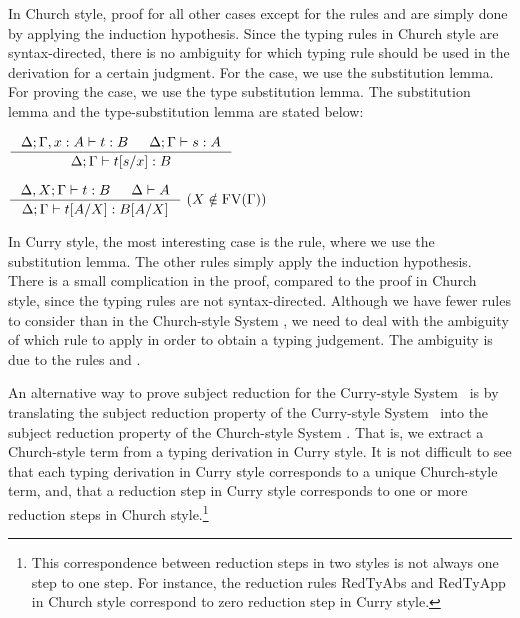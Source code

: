 In Church style, proof for all other cases except for the rules
 and  are simply done by applying
the induction hypothesis. Since the typing rules in Church style are
syntax-directed, there is no ambiguity for which typing rule should be used
in the derivation for a certain judgment. For the  case,
we use the substitution lemma. For proving the  case,
we use the type substitution lemma. The substitution lemma and
the type-substitution lemma are stated below:
\begin{lemma}[substitution]
$ \inference{\Delta;\Gamma,x:A |- t : B  & \Delta;\Gamma |- s : A}
        {\Delta;\Gamma |- t[s/x] : B} $
\end{lemma}
\begin{lemma}
$ \inference{\Delta,X;\Gamma |- t : B  & \Delta |- A}
        {\Delta;\Gamma |- t[A/X] : B[A/X]} ~ (X\notin\FV(\Gamma))$
\end{lemma}

In Curry style, the most interesting case is the  rule,
where we use the substitution lemma. The other rules simply apply
the induction hypothesis. There is a small complication in the proof,
compared to the proof in Church style, since the typing rules are
not syntax-directed. Although we have fewer rules to consider than
in the Church-style System \F, we need to deal with the ambiguity of
which rule to apply in order to obtain a typing judgement.
The ambiguity is due to the rules  and .

An alternative way to prove subject reduction for the Curry-style System \F\ is
by translating the subject reduction property of the Curry-style System \F\ into
the subject reduction property of the Church-style System \F. That is,
we extract a Church-style term from a typing derivation in Curry style.
It is not difficult to see that each typing derivation in Curry style
corresponds to a unique Church-style term, and, that a reduction step
in Curry style corresponds to one or more reduction steps
in Church style.\footnote{
	This correspondence between reduction steps in two styles
	is not always one step to one step. For instance,
	the reduction rules {\sc RedTyAbs} and {\sc RedTyApp}
	in Church style correspond to zero reduction step in Curry style.}

